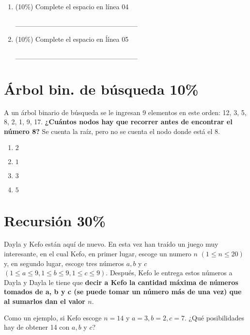\documentclass[twocolumn]{article}
\begin{document}
\begin{enumerate}[label=\Alph*]
	\item (10\%) Complete el espacio en línea 04

	\_\_\_\_\_\_\_\_\_\_\_\_\_\_\_\_\_\_\_\_\_\_\_\_

	\item (10\%) Complete el espacio en ĺínea 05

	\_\_\_\_\_\_\_\_\_\_\_\_\_\_\_\_\_\_\_\_\_\_\_\_

\end{enumerate}


\section{Árbol bin. de búsqueda 10\%}

A un árbol binario de búsqueda se le ingresan 9 elementos en este orden: 12, 3, 5, 8, 2, 1, 9, 17.  \textbf{¿Cuántos nodos hay que recorrer antes de encontrar el número 8?} Se cuenta la raíz, pero no se cuenta el nodo donde está el 8.

\begin{enumerate}[label=\Alph*]
	\item $2$
	\item $1$
	\item $3$
	\item $5$
\end{enumerate}

%

\section{Recursión 30\%}

Dayla y Kefo están aquí de nuevo. En esta vez han traído un juego muy interesante, en el cual Kefo, en primer lugar, escoge un numero $n$ $(1 \leq n \leq 20)$ y, en segundo lugar, escoge tres números $a, b$ y $c$ $(1 \leq a \leq 9, 1 \leq b \leq 9, 1 \leq c \leq 9)$. Después, Kefo le entrega estos números a Dayla y Dayla le tiene que \textbf{decir a Kefo la cantidad máxima de números tomados de  a, b y c (se puede tomar un número más de una vez)  que al sumarlos dan el valor $n$}. 

Como un ejemplo, si Kefo escoge $n = 14$ y $a = 3, b = 2, c = 7$. ¿Qué posibilidades hay de obtener 14 con $a, b$ y $c$?\\
\end{document}
